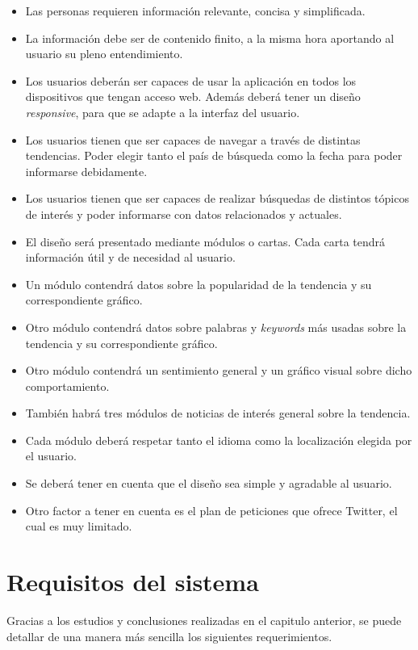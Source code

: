 \begin{itemize}
    \item
    Las personas requieren información relevante, concisa y simplificada.
    \item
    La información debe ser de contenido finito, a la misma hora aportando al usuario su pleno entendimiento.
    \item
    Los usuarios deberán ser capaces de usar la aplicación en todos los dispositivos que tengan acceso web. Además deberá tener un diseño \textit{responsive}, para que se adapte a la interfaz del usuario.
    \item
    Los usuarios tienen que ser capaces de navegar a través de distintas tendencias. Poder elegir tanto el país de búsqueda como la fecha para poder informarse debidamente.
    \item
    Los usuarios tienen que ser capaces de realizar búsquedas de distintos tópicos de interés y poder informarse con datos relacionados y actuales.
    \item
    El diseño será presentado mediante módulos o cartas. Cada carta tendrá información útil y de necesidad al usuario.
    \item
    Un módulo contendrá datos sobre la popularidad de la tendencia y su correspondiente gráfico.
    \item
    Otro módulo contendrá datos sobre palabras y \textit{keywords} más usadas sobre la tendencia y su correspondiente gráfico.
    \item
    Otro módulo contendrá un sentimiento general y un gráfico visual sobre dicho comportamiento.
    \item
    También habrá tres módulos de noticias de interés general sobre la tendencia.
    \item
    Cada módulo deberá respetar tanto el idioma como la localización elegida por el usuario.
    \item
    Se deberá tener en cuenta que el diseño sea simple y agradable al usuario.
    \item
    Otro factor a tener en cuenta es el plan de peticiones que ofrece Twitter, el cual es muy limitado.
\end{itemize}

\chapter{Requisitos del sistema}
Gracias a los estudios y conclusiones realizadas en el capitulo anterior, se puede detallar de una manera más sencilla los siguientes requerimientos.
